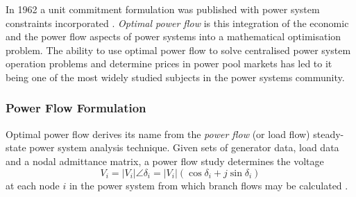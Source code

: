 In 1962 a unit commitment formulation was published with power system
constraints incorporated \cite{carpentier:opf}.  \textit{Optimal power flow} is
this integration of the economic and the power flow aspects of power systems into a
mathematical optimisation problem.  The ability to use optimal power flow to
solve centralised power system operation problems and determine prices in power
pool markets has led to it being one of the most widely studied subjects in
the power systems community.

\subsubsection{Power Flow Formulation}
\label{sec:pf_form}
Optimal power flow derives its name from the \textit{power flow} (or load flow)
steady-state power system analysis technique.  Given sets of generator data,
load data and a nodal admittance matrix, a power flow study determines the
voltage
\begin{equation}
V_i = \vert V_i \vert \angle\delta_i = \vert
V_i\vert(\cos\delta_i + j\sin\delta_i)
\end{equation}
at each node $i$ in the power system from which branch flows may be calculated
\cite{grainger:psa}.

